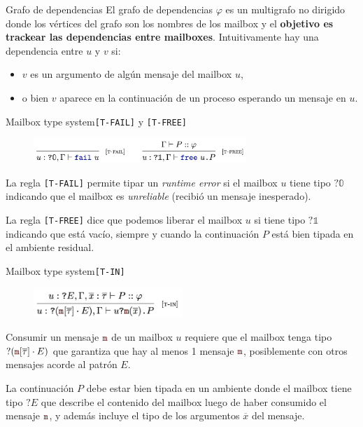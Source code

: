 \documentclass{beamer}
\newcommand{\msgtag}[1]{\texttt{\textcolor{msg-color}{#1}}}
\newcommand{\msgstore}[2]{\msgtag{#1}[\overline{#2}]}
\begin{document}
\begin{frame}{Grafo de dependencias}
    El grafo de dependencias $\varphi$ es un multigrafo no dirigido donde los vértices del grafo son los nombres de los mailbox y el \textbf{objetivo es trackear las dependencias entre mailboxes}. Intuitivamente hay una dependencia entre $u$ y $v$ si:
    \vspace{1em}

    \begin{itemize}
        \item $v$ es un argumento de algún mensaje del mailbox $u$,
        \item o bien $v$ aparece en la continuación de un proceso esperando un mensaje en $u$.
    \end{itemize}
\end{frame}

\begin{frame}{Mailbox type system}{\texttt{[T-FAIL]} y \texttt{[T-FREE]}}
    \begin{figure}[H]
        \includegraphics[height=2.5em]{typing-rules-t-fail-t-free}
    \end{figure}

    La regla \texttt{[T-FAIL]} permite tipar un \emph{runtime error} si el mailbox $u$ tiene tipo $?\mathbb{0}$ indicando que el mailbox es \emph{unreliable} (recibió un mensaje inesperado).
    \vspace{1em}

    La regla \texttt{[T-FREE]} dice que podemos liberar el mailbox $u$ si tiene tipo $?\mathbb{1}$ indicando que está vacío, siempre y cuando la continuación $P$ está bien tipada en el ambiente residual.
\end{frame}

\begin{frame}{Mailbox type system}{\texttt{[T-IN]}}
    \begin{figure}[H]
        \includegraphics[height=3em]{typing-rules-t-in}
    \end{figure}

    Consumir un mensaje $\msgtag{m}$ de un mailbox $u$ requiere que el mailbox tenga tipo $?(\msgstore{m}{\tau} \cdot E)$ que garantiza que hay al menos 1 mensaje $\msgtag{m}$, posiblemente con otros mensajes acorde al patrón $E$.
    \vspace{1em}

    La continuación $P$ debe estar bien tipada en un ambiente donde el mailbox tiene tipo $?E$ que describe el contenido del mailbox luego de haber consumido el mensaje $\msgtag{m}$, y además incluye el tipo de los argumentos $\overline{x}$ del mensaje.
\end{frame}
\end{document}
